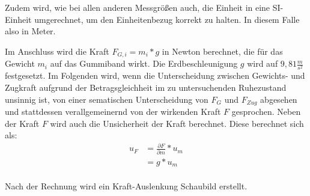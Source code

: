 \documentclass[
  9pt,
]{article}
\begin{document}
Zudem wird, wie bei allen anderen Messgrößen auch, die Einheit in eine
SI-Einheit umgerechnet, um den Einheitenbezug korrekt zu halten. In
diesem Falle also in Meter.

Im Anschluss wird die Kraft \(F_{G,i} = m_i * g\) in Newton berechnet,
die für das Gewicht \(m_i\) auf das Gummiband wirkt. Die
Erdbeschleunigung \(g\) wird auf \(9,81\frac{m}{s^2}\) festgesetzt. Im
Folgenden wird, wenn die Unterscheidung zwischen Gewichts- und Zugkraft
aufgrund der Betragsgleichheit im zu untersuchenden Ruhezustand unsinnig
ist, von einer sematischen Unterscheidung von \(F_G\) und \(F_{Zug}\)
abgesehen und stattdessen verallgemeinernd von der wirkenden Kraft \(F\)
gesprochen. Neben der Kraft \(F\) wird auch die Unsicherheit der Kraft
berechnet. Diese berechnet sich als: \begin{equation}
\begin{split}
u_F &= \frac{\partial F}{\partial {m}}*u_m\\
    &= g*u_m\\
\end{split}
\end{equation}

Nach der Rechnung wird ein Kraft-Auslenkung Schaubild erstellt.
\end{document}
